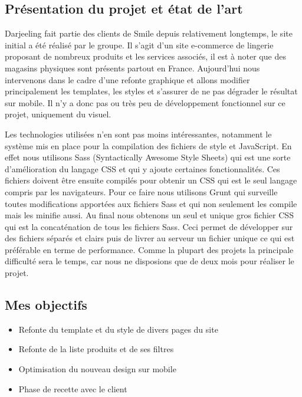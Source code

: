 \documentclass[a4paper,11pt,twoside]{report}
\begin{document}
    \subsection*{Présentation du projet et état de l'art}
    Darjeeling fait partie des clients de Smile depuis relativement longtemps, le site initial a été réalisé par le groupe. Il s'agit d'un site e-commerce de lingerie proposant de nombreux produits et les services associés, il est à noter que des magasins physiques sont présents partout en France. Aujourd'hui nous intervenons dans le cadre d'une refonte graphique et allons modifier principalement les templates, les styles et s'assurer de ne pas dégrader le résultat sur mobile. Il n'y a donc pas ou très peu de développement fonctionnel sur ce projet, uniquement du visuel. 
    
    Les technologies utilisées n'en sont pas moins intéressantes, notamment le système mis en place pour la compilation des fichiers de style et JavaScript. En effet nous utilisons Sass (Syntactically Awesome Style Sheets) qui est une sorte d'amélioration du langage CSS et qui y ajoute certaines fonctionnalités. Ces fichiers doivent être ensuite compilés pour obtenir un CSS qui est le seul langage compris par les navigateurs. Pour ce faire nous utilisons Grunt qui surveille toutes modifications apportées aux fichiers Sass et qui non seulement les compile mais les minifie aussi. Au final nous obtenons un seul et unique gros fichier CSS qui est la concaténation de tous les fichiers Sass. Ceci permet de développer sur des fichiers séparés et clairs puis de livrer au serveur un fichier unique ce qui est préférable en terme de performance. Comme la plupart des projets la principale difficulté sera le temps, car nous ne disposions que de deux mois pour réaliser le projet.
    \subsection*{Mes objectifs}
      \begin{itemize}

	\item Refonte du template et du style de divers pages du site
	\item Refonte de la liste produits et de ses filtres
	\item Optimisation du nouveau design sur mobile
	\item Phase de recette avec le client

      \end{itemize}
\end{document}
